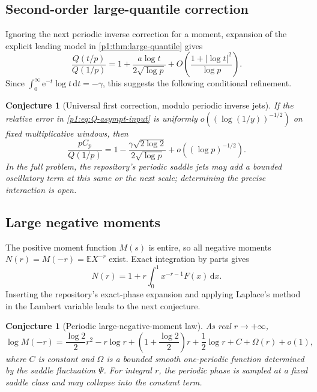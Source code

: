 \documentclass[11pt,oneside]{article}
\newtheorem{conjecture}[theorem]{Conjecture}
\theoremstyle{definition}
\theoremstyle{remark}
\newcommand{\E}{\mathbb E}
\newcommand{\dd}{\,\mathrm d}
\newcommand{\e}{\mathrm e}
\newcommand{\1}{\mathbf 1}
\begin{document}
\subsection{Second-order large-quantile correction}
Ignoring the next periodic inverse correction for a moment, expansion of the
explicit leading model in \cref{p1:thm:large-quantile} gives
\[
 \frac{Q(t/p)}{Q(1/p)}
 =1+\frac{a\log t}{2\sqrt{\log p}}+O\!\left(\frac{1+|\log t|^2}{\log p}\right).
\]
Since \(\int_0^\infty\e^{-t}\log t\dd t=-\gamma\), this suggests the
following conditional refinement.

\begin{conjecture}[Universal first correction, modulo periodic inverse jets]
\label{p1:conj:quantile-second}
If the relative error in \eqref{p1:eq:Q-asympt-input} is uniformly
\(o((\log(1/y))^{-1/2})\) on fixed multiplicative windows, then
\begin{equation}
 \frac{pC_p}{Q(1/p)}
 =1-\frac{\gamma\sqrt{2\log2}}{2\sqrt{\log p}}
 +o((\log p)^{-1/2}).                                         \label{p1:eq:conj-quantile-second}
\end{equation}
In the full problem, the repository's periodic saddle jets may add a bounded
oscillatory term at this same or the next scale; determining the precise
interaction is open.
\end{conjecture}

\subsection{Large negative moments}
The positive moment function \(M(s)\) is entire, so all negative moments
\(N(r)=M(-r)=\E X^{-r}\) exist.  Exact integration by parts gives
\begin{equation}
 N(r)=1+r\int_0^1x^{-r-1}F(x)\dd x.                            \label{p1:eq:negative-moment-exact}
\end{equation}
Inserting the repository's exact-phase expansion and applying Laplace's method
in the Lambert variable leads to the next conjecture.

\begin{conjecture}[Periodic large-negative-moment law]\label{p1:conj:negative-moments}
As real \(r\to+\infty\),
\begin{equation}
 \log M(-r)
 =\frac{\log2}{2}r^2-r\log r
 +\left(1+\frac{\log2}{2}\right)r
 +\frac12\log r+C+\Omega(r)+o(1),                              \label{p1:eq:conj-negative-moment}
\end{equation}
where \(C\) is constant and \(\Omega\) is a bounded smooth one-periodic
function determined by the saddle fluctuation \(\Psi\).  For integral \(r\),
the periodic phase is sampled at a fixed saddle class and may collapse into
the constant term.
\end{conjecture}
\end{document}
